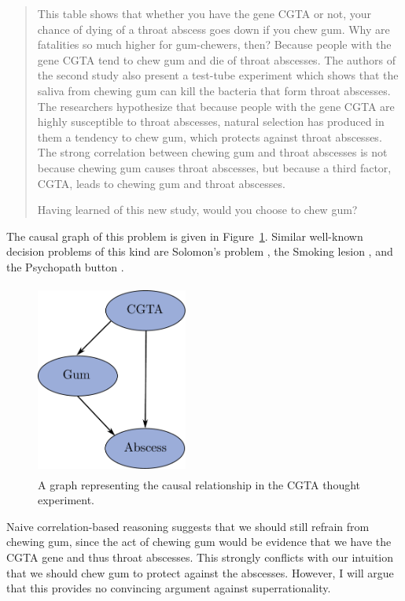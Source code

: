 \begin{quote}
This table shows that whether you have the gene CGTA or not, your chance
of dying of a throat abscess goes down if you chew gum. Why are
fatalities so much higher for gum-chewers, then? Because people with the
gene CGTA tend to chew gum and die of throat abscesses. The authors of
the second study also present a test-tube experiment which shows that
the saliva from chewing gum can kill the bacteria that form throat
abscesses. The researchers hypothesize that because people with the gene
CGTA are highly susceptible to throat abscesses, natural selection has
produced in them a tendency to chew gum, which protects against throat
abscesses. The strong correlation between chewing gum and throat
abscesses is not because chewing gum causes throat abscesses, but
because a third factor, CGTA, leads to chewing gum and throat abscesses.

Having learned of this new study, would you choose to chew gum?
\end{quote}

The causal graph of this problem is given in Figure~\ref{causal-graph-CGTA}.
Similar well-known decision problems of this kind are Solomon's problem
\parencite{Gibbard1978-nw,Eells2016-ym}, the Smoking lesion
\parencite{Eells2016-ym}, and the Psychopath button
\parencite{Egan2007-ey}.
\begin{figure}
    \centering
    \includegraphics[width=1.95625in,height=2.48452in]{figs/causal-graph-CGTA}
    \caption{A graph representing the causal relationship
in the CGTA thought experiment.}
    \label{causal-graph-CGTA}
\end{figure}
%

Naive correlation-based reasoning suggests that we should still refrain
from chewing gum, since the act of chewing gum would be evidence that we
have the CGTA gene and thus throat abscesses. This strongly conflicts
with our intuition that we should chew gum to protect against the
abscesses. However, I will argue that this provides no convincing
argument against superrationality.

